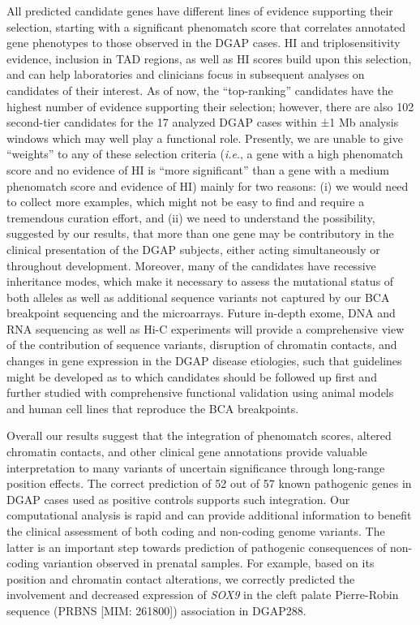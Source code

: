 \documentclass[a4paper,twoside=true,openright,parskip=full,chapterprefix=true,11pt,headings=normal,bibliography=totoc,listof=totoc,titlepage=on,captions=tableabove,draft=false]{scrreprt}
\theoremstyle{definition}
\theoremstyle{definition}
\theoremstyle{definition}
\theoremstyle{remark}
\begin{document}
All predicted candidate genes have different lines of evidence
supporting their selection, starting with a significant phenomatch score
that correlates annotated gene phenotypes to those observed in the DGAP
cases. HI and triplosensitivity evidence, inclusion in TAD regions, as
well as HI scores build upon this selection, and can help laboratories
and clinicians focus in subsequent analyses on candidates of their
interest. As of now, the ``top-ranking'' candidates have the highest
number of evidence supporting their selection; however, there are also
102 second-tier candidates for the 17 analyzed DGAP cases within ±1 Mb
analysis windows which may well play a functional role. Presently, we
are unable to give ``weights'' to any of these selection criteria
(\emph{i.e}., a gene with a high phenomatch score and no evidence of HI
is ``more significant'' than a gene with a medium phenomatch score and
evidence of HI) mainly for two reasons: (i) we would need to collect
more examples, which might not be easy to find and require a tremendous
curation effort, and (ii) we need to understand the possibility,
suggested by our results, that more than one gene may be contributory in
the clinical presentation of the DGAP subjects, either acting
simultaneously or throughout development. Moreover, many of the
candidates have recessive inheritance modes, which make it necessary to
assess the mutational status of both alleles as well as additional
sequence variants not captured by our BCA breakpoint sequencing and the
microarrays. Future in-depth exome, DNA and RNA sequencing as well as
Hi-C experiments will provide a comprehensive view of the contribution
of sequence variants, disruption of chromatin contacts, and changes in
gene expression in the DGAP disease etiologies, such that guidelines
might be developed as to which candidates should be followed up first
and further studied with comprehensive functional validation using
animal models and human cell lines that reproduce the BCA breakpoints.

Overall our results suggest that the integration of phenomatch scores,
altered chromatin contacts, and other clinical gene annotations provide
valuable interpretation to many variants of uncertain significance
through long-range position effects. The correct prediction of 52 out of
57 known pathogenic genes in DGAP cases used as positive controls
supports such integration. Our computational analysis is rapid and can
provide additional information to benefit the clinical assessment of
both coding and non-coding genome variants. The latter is an important
step towards prediction of pathogenic consequences of non-coding
variantion observed in prenatal samples. For example, based on its
position and chromatin contact alterations, we correctly predicted the
involvement and decreased expression of \emph{SOX9} in the cleft palate
Pierre-Robin sequence (PRBNS {[}MIM: 261800{]}) association in
DGAP288.\citep{Ordulu2016}
\end{document}

